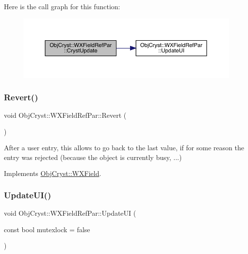 Here is the call graph for this function\+:
\nopagebreak
\begin{figure}[H]
\begin{center}
\leavevmode
\includegraphics[width=350pt]{class_obj_cryst_1_1_w_x_field_ref_par_a91bdc3391485b7376466af6046a62df7_cgraph}
\end{center}
\end{figure}
\mbox{\label{class_obj_cryst_1_1_w_x_field_ref_par_acc2b6724451be954f41a64e09d6cf082}} 
\subsubsection{\texorpdfstring{Revert()}{Revert()}}
{\footnotesize\ttfamily void Obj\+Cryst\+::\+W\+X\+Field\+Ref\+Par\+::\+Revert (\begin{DoxyParamCaption}{ }\end{DoxyParamCaption})\hspace{0.3cm}{\ttfamily [virtual]}}

After a user entry, this allows to go back to the last value, if for some reason the entry was rejected (because the object is currently busy, ...) 

Implements \mbox{\hyperlink{class_obj_cryst_1_1_w_x_field_a178d6d770d1e3adfa02e27da94b2dffa}{Obj\+Cryst\+::\+W\+X\+Field}}.

\mbox{\label{class_obj_cryst_1_1_w_x_field_ref_par_aa11b53ed79e160ec1201c5743aef80ca}} 
\subsubsection{\texorpdfstring{UpdateUI()}{UpdateUI()}}
{\footnotesize\ttfamily void Obj\+Cryst\+::\+W\+X\+Field\+Ref\+Par\+::\+Update\+UI (\begin{DoxyParamCaption}\item[{const bool}]{mutexlock = {\ttfamily false} }\end{DoxyParamCaption})\hspace{0.3cm}{\ttfamily [virtual]}}

